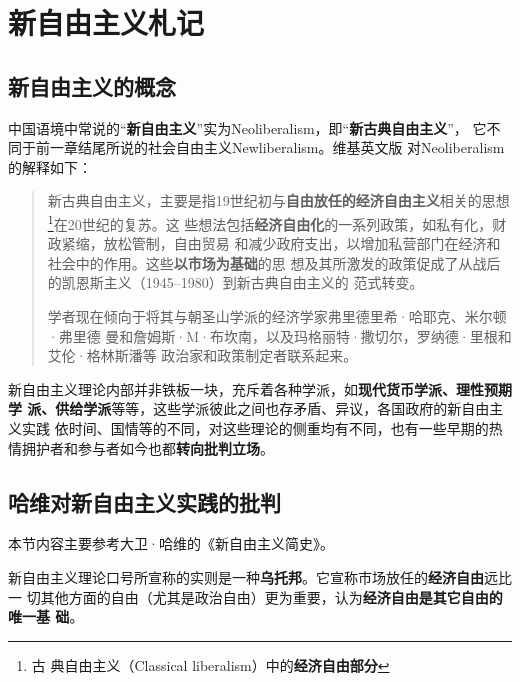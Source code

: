 \chapter{新自由主义札记}
\label{chap:neoliber}

\section{新自由主义的概念}
\label{sec:neoliberalism}


中国语境中常说的“\textbf{新自由主义}”实为Neoliberalism，即“\textbf{新古典自由主义}”，
它不同于前一章结尾所说的社会自由主义Newliberalism。维基英文版
对Neoliberalism的解释如下：
\begin{quotation}
  新古典自由主义，主要是指19世纪初与\textbf{自由放任的经济自由主义}相关的思想\footnote{古
    典自由主义（Classical liberalism）中的\textbf{经济自由部分}}在20世纪的复苏。这
  些想法包括\textbf{经济自由化}的一系列政策，如私有化，财政紧缩，放松管制，自由贸易
  和减少政府支出，以增加私营部门在经济和社会中的作用。这些\textbf{以市场为基础}的思
  想及其所激发的政策促成了从战后的凯恩斯主义（1945--1980）到新古典自由主义的
  范式转变。

  学者现在倾向于将其与朝圣山学派的经济学家弗里德里希·哈耶克、米尔顿·弗里德
  曼和詹姆斯·M·布坎南，以及玛格丽特·撒切尔，罗纳德·里根和艾伦·格林斯潘等
  政治家和政策制定者联系起来。
\end{quotation}

新自由主义理论内部并非铁板一块，充斥着各种学派，如\textbf{现代货币学派、理性预期学
  派、供给学派}等等，这些学派彼此之间也存矛盾、异议，各国政府的新自由主义实践
依时间、国情等的不同，对这些理论的侧重均有不同\cite{neoxuepai}，也有一些早期的热
情拥护者和参与者如今也都\textbf{转向批判立场}。


\section{哈维对新自由主义实践的批判}

本节内容主要参考大卫·哈维的《新自由主义简史》。

新自由主义理论口号所宣称的实则是一种\textbf{乌托邦}。它宣称市场放任的\textbf{经济自由}远比一
切其他方面的自由（尤其是政治自由）更为重要，认为\textbf{经济自由是其它自由的唯一基
础}。

